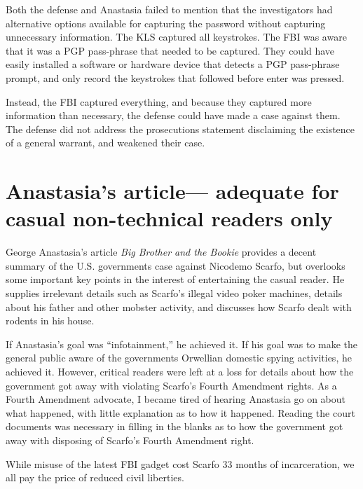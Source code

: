 \documentclass[12pt,titlepage]{article}             %
\begin{document}
  Both the defense and Anastasia failed to mention that the
  investigators had alternative options available for capturing the
  password without capturing unnecessary information.  The KLS
  captured all keystrokes.  The FBI was aware that it was a PGP
  pass-phrase that needed to be captured.  They could have easily
  installed a software or hardware device that detects a PGP
  pass-phrase prompt, and only record the keystrokes that followed
  before enter was pressed.  
  
  Instead, the FBI captured everything, and because they captured more
  information than necessary, the defense could have made a case
  against them.  The defense did not address the prosecutions
  statement disclaiming the existence of a general warrant, and
  weakened their case.

  \section{Anastasia's article--- adequate for casual non-technical readers only}
  
  George Anastasia's article \textit{Big Brother and the Bookie}
  provides a decent summary of the U.S. governments case against
  Nicodemo Scarfo, but overlooks some important key points in the
  interest of entertaining the casual reader.  He supplies irrelevant
  details such as Scarfo's illegal video poker machines, details about
  his father and other mobster activity, and discusses how Scarfo
  dealt with rodents in his house.
  
  If Anastasia's goal was ``infotainment,'' he achieved it.  If his
  goal was to make the general public aware of the governments
  Orwellian domestic spying activities, he achieved it.  However,
  critical readers were left at a loss for details about how the
  government got away with violating Scarfo's Fourth Amendment rights.
  As a Fourth Amendment advocate, I became tired of hearing Anastasia
  go on about what happened, with little explanation as to how it
  happened.  Reading the court documents was necessary in filling in
  the blanks as to how the government got away with disposing of
  Scarfo's Fourth Amendment right.
  
  While misuse of the latest FBI gadget cost Scarfo 33 months of
  incarceration, we all pay the price of reduced civil liberties.


  \pagebreak
  
    
\end{document}
